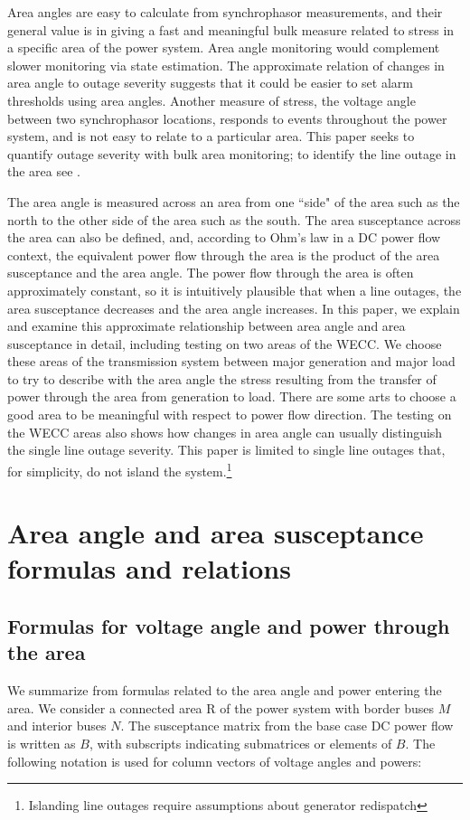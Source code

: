 \documentclass[conference]{IEEEtran}
\begin{document}
 Area angles are easy to calculate from synchrophasor measurements, and their general value is in 
 giving a fast and meaningful bulk measure related to stress in a specific area of the power system.
Area angle monitoring would complement slower monitoring via state estimation.
 The approximate relation of changes in area angle to outage severity suggests that it could be 
 easier to set alarm thresholds using area angles.
Another  measure of stress, the voltage angle between two synchrophasor locations, responds to events throughout the power system, 
and is not easy to relate to a particular area.
This paper seeks to quantify outage severity with bulk area monitoring; to identify the line outage in the area see \cite{SehwailNAPS12,SehwailPS13,TatePS08}.

The area angle is measured across an area from one ``side" of the area such as the north to the other side of the area such as the south.
The area susceptance across the area can also be defined, and, according to Ohm's law in a DC power flow context, the equivalent power 
flow through the area is the product of the area susceptance and the area angle.
The power flow through the area is often approximately constant, so it is 
intuitively plausible that when a line outages, the area susceptance decreases and the area angle increases.
In this paper, we explain and examine this approximate relationship between area angle and area susceptance in detail,
including testing on two areas of the WECC. We choose these areas of the transmission system between major generation and major load
   to try to describe with the area angle the stress resulting from the 
   transfer of power through the area from generation to load. There are some arts to choose a good area to be meaningful with respect to power flow direction.
The testing on the WECC areas also shows how changes in area angle can usually distinguish the single line outage severity.
This paper is limited to single line outages that, for simplicity, do not island the system.\footnote{Islanding line outages require assumptions about generator redispatch}
 
 \section{Area angle and area susceptance formulas and relations}
 
\subsection{Formulas for voltage angle and power through the area}
\label{formulas}
We summarize from \cite{DobsonvoltPS12} formulas related to the area angle and power entering the area.
    We consider a connected area R of the power system with border buses $M$ and interior buses $N$.
The susceptance matrix from the base case DC power flow is written as $B$, with subscripts indicating submatrices or elements of $B$.
      The following notation is used for column vectors of voltage angles and powers:
      
\end{document}
